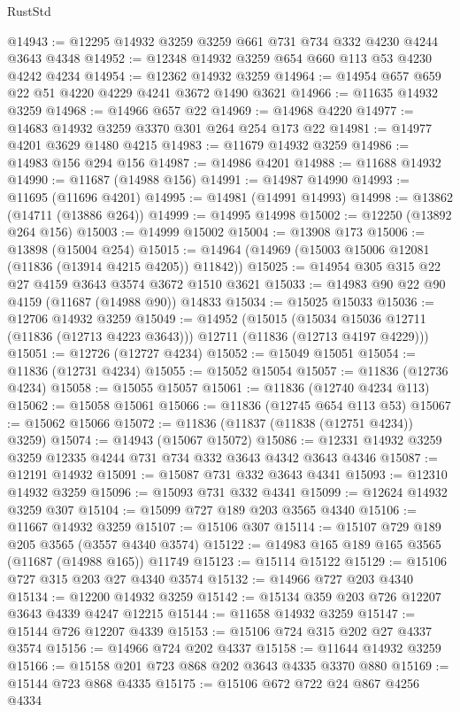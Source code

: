 \begin{lexlean}{RustStd}
\begin{coremodule}
@14943 := @12295 @14932 @3259 @3259 @661 @731 @734 @332 @4230 @4244 @3643 @4348
@14952 := @12348 @14932 @3259 @654 @660 @113 @53 @4230 @4242 @4234
@14954 := @12362 @14932 @3259
@14964 := @14954 @657 @659 @22 @51 @4220 @4229 @4241 @3672 @1490 @3621
@14966 := @11635 @14932 @3259
@14968 := @14966 @657 @22
@14969 := @14968 @4220
@14977 := @14683 @14932 @3259 @3370 @301 @264 @254 @173 @22
@14981 := @14977 @4201 @3629 @1480 @4215
@14983 := @11679 @14932 @3259
@14986 := @14983 @156 @294 @156
@14987 := @14986 @4201
@14988 := @11688 @14932
@14990 := @11687 (@14988 @156)
@14991 := @14987 @14990
@14993 := @11695 (@11696 @4201)
@14995 := @14981 (@14991 @14993)
@14998 := @13862 (@14711 (@13886 @264))
@14999 := @14995 @14998
@15002 := @12250 (@13892 @264 @156)
@15003 := @14999 @15002
@15004 := @13908 @173
@15006 := @13898 (@15004 @254)
@15015 := @14964 (@14969 (@15003 @15006 @12081 (@11836 (@13914 @4215 @4205)) @11842))
@15025 := @14954 @305 @315 @22 @27 @4159 @3643 @3574 @3672 @1510 @3621
@15033 := @14983 @90 @22 @90 @4159 (@11687 (@14988 @90)) @14833
@15034 := @15025 @15033
@15036 := @12706 @14932 @3259
@15049 := @14952
    (@15015
      (@15034 @15036 @12711 (@11836 (@12713 @4223 @3643)))
      @12711
      (@11836 (@12713 @4197 @4229)))
@15051 := @12726 (@12727 @4234)
@15052 := @15049 @15051
@15054 := @11836 (@12731 @4234)
@15055 := @15052 @15054
@15057 := @11836 (@12736 @4234)
@15058 := @15055 @15057
@15061 := @11836 (@12740 @4234 @113)
@15062 := @15058 @15061
@15066 := @11836 (@12745 @654 @113 @53)
@15067 := @15062 @15066
@15072 := @11836 (@11837 (@11838 (@12751 @4234)) @3259)
@15074 := @14943 (@15067 @15072)
@15086 := @12331 @14932 @3259 @3259 @12335 @4244 @731 @734 @332 @3643 @4342 @3643 @4346
@15087 := @12191 @14932
@15091 := @15087 @731 @332 @3643 @4341
@15093 := @12310 @14932 @3259
@15096 := @15093 @731 @332 @4341
@15099 := @12624 @14932 @3259 @307
@15104 := @15099 @727 @189 @203 @3565 @4340
@15106 := @11667 @14932 @3259
@15107 := @15106 @307
@15114 := @15107 @729 @189 @205 @3565 (@3557 @4340 @3574)
@15122 := @14983 @165 @189 @165 @3565 (@11687 (@14988 @165)) @11749
@15123 := @15114 @15122
@15129 := @15106 @727 @315 @203 @27 @4340 @3574
@15132 := @14966 @727 @203 @4340
@15134 := @12200 @14932 @3259
@15142 := @15134 @359 @203 @726 @12207 @3643 @4339 @4247 @12215
@15144 := @11658 @14932 @3259
@15147 := @15144 @726 @12207 @4339
@15153 := @15106 @724 @315 @202 @27 @4337 @3574
@15156 := @14966 @724 @202 @4337
@15158 := @11644 @14932 @3259
@15166 := @15158 @201 @723 @868 @202 @3643 @4335 @3370 @880
@15169 := @15144 @723 @868 @4335
@15175 := @15106 @672 @722 @24 @867 @4256 @4334

\end{coremodule}
\end{lexlean}
